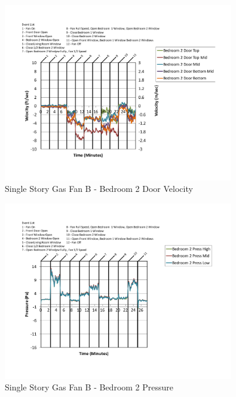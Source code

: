 \documentclass{article}
\begin{document}
\begin{appendices}
	\begin{figure}[H]
		\centering
		\includegraphics[height=3.05in,trim=0.67in 1.1in 0.67in 0.8in,clip=true]{0_Images/Results_Charts/ColdFlow/Single_Story/Gas/B/Bedroom_2_Door_Velocity.pdf}
		\caption{Single Story Gas Fan B - Bedroom 2 Door Velocity}
	\end{figure}
 

	\begin{figure}[H]
		\centering
		\includegraphics[height=3.05in,trim=0.67in 1.1in 0.67in 0.8in,clip=true]{0_Images/Results_Charts/ColdFlow/Single_Story/Gas/B/Bedroom_2_Pressure.pdf}
		\caption{Single Story Gas Fan B - Bedroom 2 Pressure}
	\end{figure}
 
	\clearpage


\end{appendices}
\end{document}
